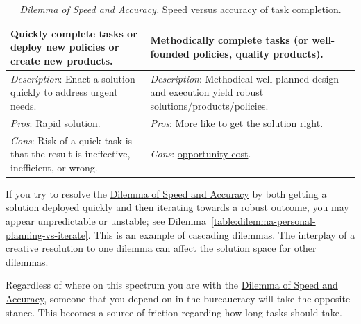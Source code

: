 \begin{center}
\begin{table}[H] %
\begin{tabular}{ | m{\dilemmatablewidth}| m{\dilemmatablewidth} | } 
  \hline
  \textbf{Quickly complete tasks or deploy new policies or create new products.} & 
  \textbf{Methodically complete tasks (or well-founded policies, quality products).} \\ 
  \hline
  \textit{Description}: Enact a solution quickly to address urgent needs. &
  \textit{Description}: Methodical well-planned design and execution yield robust solutions/products/policies. \\
  \hline
  \textit{Pros}: Rapid solution. &
  \textit{Pros}: More like to get the solution right. \\
  \hline
  \textit{Cons}: Risk of a quick task is that the result is ineffective, inefficient, or wrong. &
  \textit{Cons}: \href{https://en.wikipedia.org/wiki/Opportunity_cost}{opportunity cost}. 
  \index{Wikipedia!opportunity cost@\href{https://en.wikipedia.org/wiki/Opportunity_cost}{opportunity cost}}
  \\  
  \hline
\end{tabular}
\caption{
\textit{Dilemma of Speed and Accuracy.}
Speed versus accuracy of task completion.
}
\label{table:dilemma-personal-quick-methodical}
\end{table}
\end{center}

If you try to resolve the \hyperref[table:dilemma-personal-quick-methodical]{Dilemma of Speed and Accuracy} by both getting a solution deployed quickly and then iterating towards a robust outcome, you may appear unpredictable or unstable; see Dilemma~\ref{table:dilemma-personal-planning-vs-iterate}. This is an example of cascading dilemmas. The interplay of a creative resolution to one dilemma can affect the solution space for other dilemmas. 

Regardless of where on this spectrum you are with the \hyperref[table:dilemma-personal-quick-methodical]{Dilemma of Speed and Accuracy}, someone that you depend on in the bureaucracy will take the opposite stance. This becomes a source of friction regarding how long tasks should take. 

